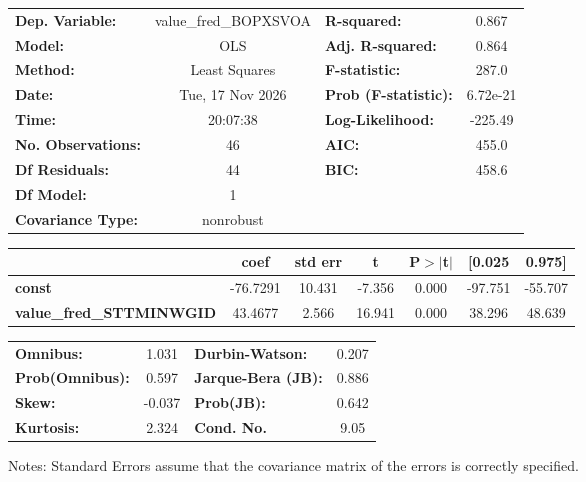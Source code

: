 \begin{center}
\begin{tabular}{lclc}
\toprule
\textbf{Dep. Variable:}          & value\_fred\_BOPXSVOA & \textbf{  R-squared:         } &     0.867   \\
\textbf{Model:}                  &          OLS          & \textbf{  Adj. R-squared:    } &     0.864   \\
\textbf{Method:}                 &     Least Squares     & \textbf{  F-statistic:       } &     287.0   \\
\textbf{Date:}                   &    Tue, 17 Nov 2026   & \textbf{  Prob (F-statistic):} &  6.72e-21   \\
\textbf{Time:}                   &        20:07:38       & \textbf{  Log-Likelihood:    } &   -225.49   \\
\textbf{No. Observations:}       &             46        & \textbf{  AIC:               } &     455.0   \\
\textbf{Df Residuals:}           &             44        & \textbf{  BIC:               } &     458.6   \\
\textbf{Df Model:}               &              1        & \textbf{                     } &             \\
\textbf{Covariance Type:}        &       nonrobust       & \textbf{                     } &             \\
\bottomrule
\end{tabular}
\begin{tabular}{lcccccc}
                                 & \textbf{coef} & \textbf{std err} & \textbf{t} & \textbf{P$> |$t$|$} & \textbf{[0.025} & \textbf{0.975]}  \\
\midrule
\textbf{const}                   &     -76.7291  &       10.431     &    -7.356  &         0.000        &      -97.751    &      -55.707     \\
\textbf{value\_fred\_STTMINWGID} &      43.4677  &        2.566     &    16.941  &         0.000        &       38.296    &       48.639     \\
\bottomrule
\end{tabular}
\begin{tabular}{lclc}
\textbf{Omnibus:}       &  1.031 & \textbf{  Durbin-Watson:     } &    0.207  \\
\textbf{Prob(Omnibus):} &  0.597 & \textbf{  Jarque-Bera (JB):  } &    0.886  \\
\textbf{Skew:}          & -0.037 & \textbf{  Prob(JB):          } &    0.642  \\
\textbf{Kurtosis:}      &  2.324 & \textbf{  Cond. No.          } &     9.05  \\
\bottomrule
\end{tabular}
\end{center}

Notes: \newline
 [1] Standard Errors assume that the covariance matrix of the errors is correctly specified.